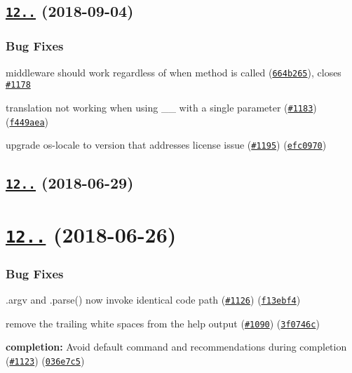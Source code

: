 \label{_12.0.2}%
 \subsection*{\href{https://github.com/yargs/yargs/compare/v12.0.1...v12.0.2}{\tt 12..} (2018-\/09-\/04)}

\subsubsection*{Bug Fixes}


\begin{DoxyItemize}
\item middleware should work regardless of when method is called (\href{https://github.com/yargs/yargs/commit/664b265}{\tt 664b265}), closes \href{https://github.com/yargs/yargs/issues/1178}{\tt \#1178}
\item translation not working when using \+\_\+\+\_\+ with a single parameter (\href{https://github.com/yargs/yargs/issues/1183}{\tt \#1183}) (\href{https://github.com/yargs/yargs/commit/f449aea}{\tt f449aea})
\item upgrade os-\/locale to version that addresses license issue (\href{https://github.com/yargs/yargs/issues/1195}{\tt \#1195}) (\href{https://github.com/yargs/yargs/commit/efc0970}{\tt efc0970})
\end{DoxyItemize}

\label{_12.0.1}%
 \subsection*{\href{https://github.com/yargs/yargs/compare/v12.0.0...v12.0.1}{\tt 12..} (2018-\/06-\/29)}

\label{_12.0.0}%
 \section*{\href{https://github.com/yargs/yargs/compare/v11.1.0...v12.0.0}{\tt 12..} (2018-\/06-\/26)}

\subsubsection*{Bug Fixes}


\begin{DoxyItemize}
\item .argv and .parse() now invoke identical code path (\href{https://github.com/yargs/yargs/issues/1126}{\tt \#1126}) (\href{https://github.com/yargs/yargs/commit/f13ebf4}{\tt f13ebf4})
\item remove the trailing white spaces from the help output (\href{https://github.com/yargs/yargs/issues/1090}{\tt \#1090}) (\href{https://github.com/yargs/yargs/commit/3f0746c}{\tt 3f0746c})
\item {\bfseries completion\+:} Avoid default command and recommendations during completion (\href{https://github.com/yargs/yargs/issues/1123}{\tt \#1123}) (\href{https://github.com/yargs/yargs/commit/036e7c5}{\tt 036e7c5})
\end{DoxyItemize}

